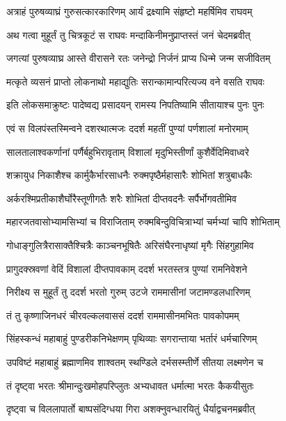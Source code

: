 \twolineshloka
{अत्राहं पुरुषव्याघ्रं गुरुसत्कारकारिणम्}
{आर्यं द्रक्ष्यामि संहृष्टो महर्षिमिव राघवम्} %

\twolineshloka
{अथ गत्वा मुहूर्तं तु चित्रकूटं स राघवः}
{मन्दाकिनीमनुप्राप्तस्तं जनं चेदमब्रवीत्} %

\twolineshloka
{जगत्यां पुरुषव्याघ्र आस्ते वीरासने रतः}
{जनेन्द्रो निर्जनं प्राप्य धिन्मे जन्म सजीवितम्} %

\twolineshloka
{मत्कृते व्यसनं प्राप्तो लोकनाथो महाद्युतिः}
{सरान्कामान्परित्यज्य वने वसति राघवः} %

\twolineshloka
{इति लोकसमाक्रुष्टः पादेष्वद्य प्रसादयन्}
{रामस्य निपतिष्यामि सीतायाश्च पुनः पुनः} %

\twolineshloka
{एवं स विलपंस्तस्मिन्वने दशरथात्मजः}
{ददर्श महतीं पुण्यां पर्णशालां मनोरमाम्} %

\twolineshloka
{सालतालाश्वकर्णानां पर्णैर्बहुभिरावृताम्}
{विशालां मृदुभिस्तीर्णां कुशैर्वेदिमिवाध्वरे} %

\twolineshloka
{शक्रायुध निकाशैश्च कार्मुकैर्भारसाधनैः}
{रुक्मपृष्ठैर्महासारैः शोभितां शत्रुबाधकैः} %

\twolineshloka
{अर्करश्मिप्रतीकाशैर्घोरैस्तूणीगतैः शरैः}
{शोभितां दीप्तवदनैः सर्पैर्भोगवतीमिव} %

\twolineshloka
{महारजतवासोभ्यामसिभ्यां च विराजिताम्}
{रुक्मबिन्दुविचित्राभ्यां चर्मभ्यां चापि शोभिताम्} %

\twolineshloka
{गोधाङ्गुलित्रैरासाक्तैश्चित्रैः काञ्चनभूषितैः}
{अरिसंघैरनाधृष्यां मृगैः सिंहगुहामिव} %

\twolineshloka
{प्रागुदक्स्रवणां वेदिं विशालां दीप्तपावकाम्}
{ददर्श भरतस्तत्र पुण्यां रामनिवेशने} %

\twolineshloka
{निरीक्ष्य स मुहूर्तं तु ददर्श भरतो गुरुम्}
{उटजे राममासीनां जटामण्डलधारिणम्} %

\twolineshloka
{तं तु कृष्णाजिनधरं चीरवल्कलवाससं}
{ददर्श राममासीनमभितः पावकोपमम्} %

\twolineshloka
{सिंहस्कन्धं महाबाहुं पुण्डरीकनिभेक्षणम्}
{पृथिव्याः सगरान्ताया भर्तारं धर्मचारिणम्} %

\twolineshloka
{उपविष्टं महाबाहुं ब्रह्माणमिव शाश्वतम्}
{स्थण्डिले दर्भसस्म्तीर्णे सीतया लक्ष्मणेन च} %

\twolineshloka
{तं दृष्ट्वा भरतः श्रीमान्दुःखमोहपरिप्लुतः}
{अभ्यधावत धर्मात्मा भरतः कैकयीसुतः} %

\twolineshloka
{दृष्ट्वा च विललापार्तो बाष्पसंदिग्धया गिरा}
{अशक्नुवन्धारयितुं धैर्याद्वचनमब्रवीत्} %

